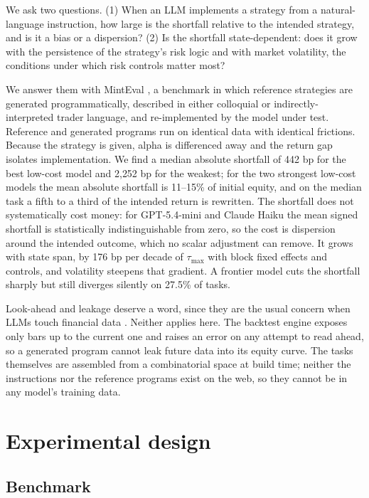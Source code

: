 \documentclass[a4paper,fleqn]{cas-sc}
\begin{document}
We ask two questions. (1) When an LLM implements a strategy from a natural-language instruction, how large is the shortfall relative to the intended strategy, and is it a bias or a dispersion? (2) Is the shortfall state-dependent: does it grow with the persistence of the strategy's risk logic and with market volatility, the conditions under which risk controls matter most?

We answer them with MintEval \citep{wang2026minteval}, a benchmark in which reference strategies are generated programmatically, described in either colloquial or indirectly-interpreted trader language, and re-implemented by the model under test. Reference and generated programs run on identical data with identical frictions. Because the strategy is given, alpha is differenced away and the return gap isolates implementation. We find a median absolute shortfall of 442 bp for the best low-cost model and 2{,}252 bp for the weakest; for the two strongest low-cost models the mean absolute shortfall is 11--15\% of initial equity, and on the median task a fifth to a third of the intended return is rewritten. The shortfall does not systematically cost money: for GPT-5.4-mini and Claude Haiku the mean signed shortfall is statistically indistinguishable from zero, so the cost is dispersion around the intended outcome, which no scalar adjustment can remove. It grows with state span, by 176 bp per decade of $\tau_{\max}$ with block fixed effects and controls, and volatility steepens that gradient. A frontier model cuts the shortfall sharply but still diverges silently on 27.5\% of tasks.

Look-ahead and leakage deserve a word, since they are the usual concern when LLMs touch financial data \citep{glasserman2024}. Neither applies here. The backtest engine exposes only bars up to the current one and raises an error on any attempt to read ahead, so a generated program cannot leak future data into its equity curve. The tasks themselves are assembled from a combinatorial space at build time; neither the instructions nor the reference programs exist on the web, so they cannot be in any model's training data.

\section{Experimental design}

\subsection{Benchmark}
\end{document}
